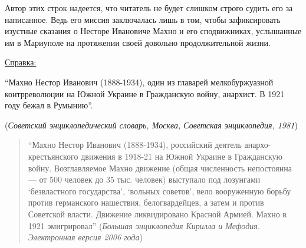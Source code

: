 Автор этих строк надеется, что читатель не будет слишком строго судить его за
написанное. Ведь его миссия заключалась лишь в том, чтобы зафиксировать
изустные сказания о Несторе Ивановиче Махно и его сподвижниках, услышанные им в
Мариуполе на протяжении своей довольно продолжительной жизни.

\underline{Справка:}

\enquote{Махно Нестор Иванович (1888-1934), один из главарей мелкобуржуазной
контрреволюции на Южной Украине в Гражданскую войну, анархист. В 1921 году
бежал в Румынию}.

(\emph{Советский энциклопедический словарь, Москва, Советская  энциклопедия, 1981})

\begin{quote}
\enquote{Махно Нестор Иванович (1888-1934), российский деятель анархо-крестьянского
движения в 1918-21 на Южной Украине в Гражданскую войну. Возглавляемое Махно
движение (общая численность непостоянна — от 500 человек до 35 тыс. человек)
выступало под лозунгами \enquote{безвластного государства}, \enquote{вольных советов}, вело
вооруженную борьбу против германского нашествия, белогвардейцев, а затем и
против Советской власти. Движение ликвидировано Красной Армией. Махно в 1921
эмигрировал} (\emph{Большая энциклопедия Кирилла и Мефодия. Электронная версия 2006
года})
\end{quote}
